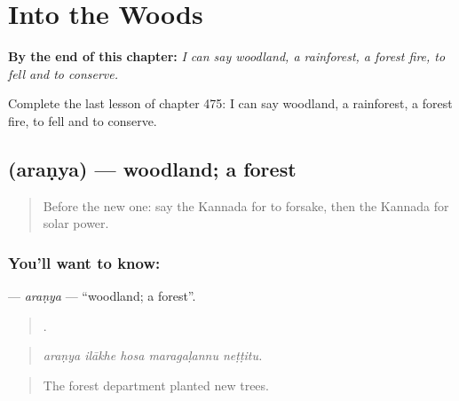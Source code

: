 
\chapter{Into the Woods}
\label{ch:ka-into-the-woods}

\begin{chapteropening}
\textbf{By the end of this chapter:} \emph{I can say woodland, a rainforest, a forest fire, to fell and to conserve.}

Complete the last lesson of chapter 475: I can say woodland, a rainforest, a forest fire, to fell and to conserve.
\end{chapteropening}

\section[\texorpdfstring{\kn{ಅರಣ್ಯ} (araṇya)}{ಅರಣ್ಯ (araṇya)}]{ (araṇya) — woodland; a forest}

\label{lesson:KA-C475-aranya}



\begin{quote}
Before the new one: say the Kannada for to forsake, then the Kannada for solar power.
\end{quote}

\subsection*{You'll want to know: }
\textbf{} — \emph{araṇya} — \textquotedblleft{}woodland; a forest\textquotedblright{}.

\begin{quote}
    .
\end{quote}

\begin{quote}
\emph{araṇya ilākhe hosa maragaḷannu neṭṭitu.}
\end{quote}

\begin{quote}
The forest department planted new trees.
\end{quote}


